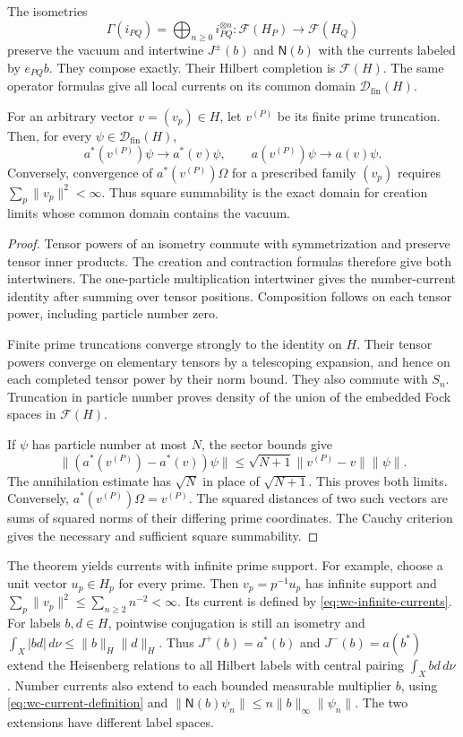 \begin{theorem}
\label{thm:wc-system}
The isometries
\[
 \Gamma(i_{PQ})=\bigoplus_{n\geq0}i_{PQ}^{\otimes n}:
 \mathcal F(H_P)\longrightarrow\mathcal F(H_Q)
\]
preserve the vacuum and intertwine $J^\pm(b)$ and $\mathsf N(b)$
with the currents labeled by $e_{PQ}b$.
They compose exactly.  Their Hilbert completion is $\mathcal F(H)$.
The same operator formulas give all local currents on its common
domain $\mathcal D_{\mathrm{fin}}(H)$.

For an arbitrary vector $v=(v_p)\in H$, let $v^{(P)}$ be its finite
prime truncation.  Then, for every $\psi\in\mathcal D_{\mathrm{fin}}(H)$,
\begin{equation}
 a^*(v^{(P)})\psi\longrightarrow a^*(v)\psi,\qquad
 a(v^{(P)})\psi\longrightarrow a(v)\psi.
 \label{eq:wc-infinite-currents}
\end{equation}
Conversely, convergence of $a^*(v^{(P)})\Omega$ for a prescribed family
$(v_p)$ requires $\sum_p\|v_p\|^2<\infty$.
Thus square summability is the exact domain for creation limits
whose common domain contains the vacuum.
\end{theorem}
\begin{proof}
Tensor powers of an isometry commute with symmetrization and preserve
tensor inner products.  The creation and contraction formulas therefore
give both intertwiners.  The one-particle multiplication intertwiner
gives the number-current identity after summing over tensor positions.
Composition follows on each tensor power, including particle number zero.

Finite prime truncations converge strongly to the identity on $H$.
Their tensor powers converge on elementary tensors by a telescoping
expansion, and hence on each completed tensor power by their norm bound.
They also commute with $S_n$.
Truncation in particle number proves density of the union of the embedded
Fock spaces in $\mathcal F(H)$.

If $\psi$ has particle number at most $N$, the sector bounds give
\[
 \|(a^*(v^{(P)})-a^*(v))\psi\|
 \leq\sqrt{N+1}\|v^{(P)}-v\|\|\psi\|.
\]
The annihilation estimate has $\sqrt N$ in place of $\sqrt{N+1}$.
This proves both limits.  Conversely,
$a^*(v^{(P)})\Omega=v^{(P)}$.
The squared distances of two such vectors are sums of squared norms
of their differing prime coordinates.  The Cauchy criterion gives the
necessary and sufficient square summability.
\end{proof}

The theorem yields currents with infinite prime support.
For example, choose a unit vector $u_p\in H_p$ for every prime.
Then $v_p=p^{-1}u_p$ has infinite support and
$\sum_p\|v_p\|^2\leq\sum_{n\geq2}n^{-2}<\infty$.
Its current is defined by \eqref{eq:wc-infinite-currents}.
For labels $b,d\in H$, pointwise conjugation is still an isometry and
$\int_X|bd|\,d\nu\leq\|b\|_H\|d\|_H$.
Thus $J^+(b)=a^*(b)$ and $J^-(b)=a(b^*)$ extend the Heisenberg
relations to all Hilbert labels with central pairing $\int_Xbd\,d\nu$.
Number currents also extend to each bounded measurable multiplier $b$,
using \eqref{eq:wc-current-definition} and
$\|\mathsf N(b)\psi_n\|\leq n\|b\|_\infty\|\psi_n\|$.
The two extensions have different label spaces.

